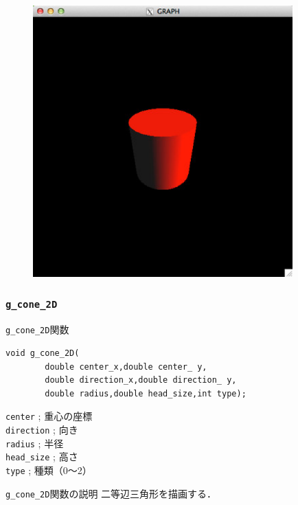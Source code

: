\documentclass[a4paper,12pt]{jsarticle}%
\begin{document}
\begin{figure}[htb]
	\includegraphics[width=100mm]{./Figures/eps/Canvas_g_cylinder.eps}
\end{figure}




\clearpage
\subsubsection{\texttt{g\_cone\_2D}}

\begin{itembox}[l]{\texttt{g\_cone\_2D}関数}
\begin{verbatim}
void g_cone_2D(
        double center_x,double center_ y,
        double direction_x,double direction_ y,
        double radius,double head_size,int type);
\end{verbatim}
\verb|center| ; 重心の座標\\
\verb|direction| ; 向き\\
\verb|radius| ; 半径\\
\verb|head_size| ; 高さ\\
\verb|type| ; 種類（0〜2）\\
\end{itembox}

\begin{itembox}[l]{\texttt{g\_cone\_2D}関数の説明}
二等辺三角形を描画する．
\end{itembox}
\end{document}
